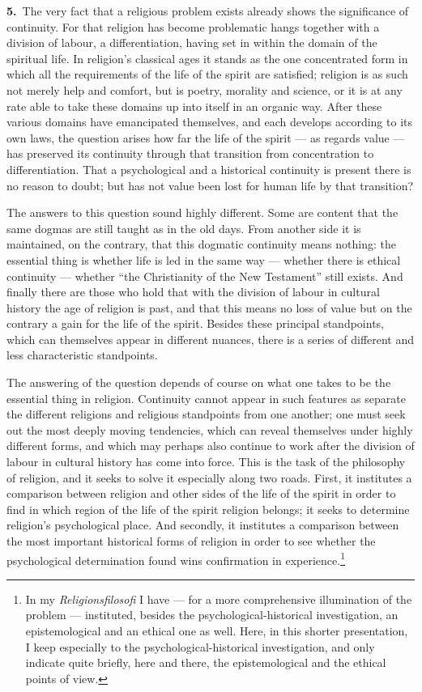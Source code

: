 \documentclass[12pt,a4paper]{book}
\newcommand{\opage}[1]{\marginnote{\footnotesize\textit{[#1]}}}
\begin{document}
\noindent\textbf{5.}~The very fact that a religious problem exists already shows
the significance of continuity. For that religion has become \opage{79}problematic hangs
together with a division of labour, a differentiation, having set in within the
domain of the spiritual life. In religion's classical ages it stands as the one
concentrated form in which all the requirements of the life of the spirit are
satisfied; religion is as such not merely help and comfort, but is poetry,
morality and science, or it is at any rate able to take these domains up into
itself in an organic way. After these various domains have emancipated
themselves, and each develops according to its own laws, the question arises how
far the life of the spirit --- as regards value --- has preserved its continuity
through that transition from concentration to differentiation. That a
psychological and a historical continuity is present there is no reason to doubt;
but has not value been lost for human life by that transition?

The answers to this question sound highly different. Some are content that the
same dogmas are still taught as in the old days. From another side it is
maintained, on the contrary, that this dogmatic continuity means nothing: the
essential thing is whether life is led in the same way --- whether there is
ethical continuity --- whether ``the Christianity of the New Testament'' still
exists. And finally there are those who hold that with the division of labour in
cultural history the age of religion is past, and that this means no loss of
value but on the contrary a gain for the life of the spirit. Besides these
principal standpoints, which can themselves appear in different nuances, there is
a series of different and less characteristic standpoints.

The answering of the question depends of course on what one takes to be the
essential thing in religion. Continuity cannot appear in such features as
separate the different religions and religious standpoints from one another; one
must seek out the most deeply moving tendencies, which can reveal themselves
under highly different forms, and which may perhaps also continue to work after
the division of labour in cultural history has come into force. This is the task
of the philosophy of religion, and it seeks to solve it especially along two
roads. First, it institutes a comparison between religion and other sides of the
life of the spirit in order to \opage{80}find in which region of the life of the spirit
religion belongs; it seeks to determine religion's psychological place. And
secondly, it institutes a comparison between the most important historical forms
of religion in order to see whether the psychological determination found wins
confirmation in experience.\footnote{In my \textit{Religionsfilosofi} I have ---
for a more comprehensive illumination of the problem --- instituted, besides the
psychological-historical investigation, an epistemological and an ethical one as
well. Here, in this shorter presentation, I keep especially to the
psychological-historical investigation, and only indicate quite briefly, here and
there, the epistemological and the ethical points of view.}
\end{document}
